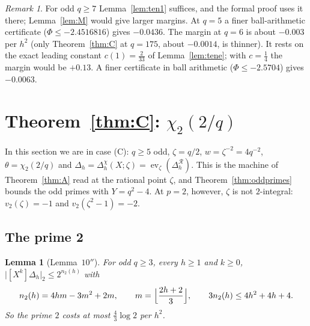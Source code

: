 \documentclass[11pt]{amsart}
\newtheorem{lemma}[theorem]{Lemma}
\theoremstyle{definition}
\theoremstyle{remark}
\newtheorem{remark}[theorem]{Remark}
\numberwithin{equation}{section}
\newcommand{\cR}{\mathcal{R}}
\newcommand{\ev}{\operatorname{ev}}
\begin{document}
\begin{remark}
For odd $q\ge7$ Lemma~\ref{lem:ten1} suffices, and the formal proof uses it there; Lemma~\ref{lem:M} would give larger
margins. At $q=5$ a finer ball-arithmetic certificate ($\Phi\le-2.4516816$) gives $-0.0436$. The margin at $q=6$ is
about $-0.003$ per $h^2$ (only Theorem~\ref{thm:C} at $q=175$, about $-0.0014$, is thinner). It rests on the exact leading constant
$c(1)=\frac2{33}$ of Lemma~\ref{lem:tene}; with $c=\frac14$ the margin would be $+0.13$. A finer certificate in ball
arithmetic ($\Phi\le-2.5704$) gives $-0.0063$.
\end{remark}

\section{\texorpdfstring{Theorem~\ref{thm:C}: $\chi_2(2/q)$}{Theorem C: chi2(2/q)}}\label{sec:C}

In this section we are in case (C): $q\ge5$ odd, $\zeta=q/2$, $w=\zeta^{-2}=4q^{-2}$, $\theta=\chi_2(2/q)$ and
$\Delta_h=\Delta^\chi_h(X;\zeta)=\ev_\zeta(\Delta^{\cR}_h)$. This is the machine of Theorem~\ref{thm:A} read at the rational point
$\zeta$, and Theorem~\ref{thm:oddprimes} bounds the odd primes with $Y=q^2-4$. At $p=2$, however, $\zeta$ is not
$2$-integral: $v_2(\zeta)=-1$ and $v_2(\zeta^2-1)=-2$.

\subsection{The prime 2}

\begin{lemma}[Lemma~$10''$]\label{lem:tenZ}
For odd $q\ge3$, every $h\ge1$ and $k\ge0$, $\bigl|[X^k]\Delta_h\bigr|_2\le2^{n_2(h)}$ with
\[
  n_2(h)=4hm-3m^2+2m,\qquad m=\Bigl\lfloor\frac{2h+2}3\Bigr\rfloor,\qquad 3n_2(h)\le4h^2+4h+4 .
\]
So the prime $2$ costs at most $\frac43\log2$ per $h^2$.
\end{lemma}
\end{document}
